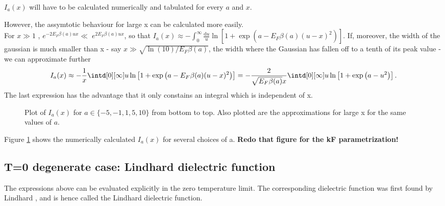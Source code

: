 \documentclass[physics,phd,nolot,nolof]{uccthesis}%
\newcommand{\alert}[1]{\textbf{\color{red}#1}}
\begin{document}
{$I_a(x)$ will have to be calculated numerically and tabulated for every $a$ and $x$. 

However, the assymtotic behaviour for large x can be calculated more easily.\\
For $x\gg1$ , $e^{-2E_F\beta(a)ux}\ll\;e^{2E_F\beta(a)ux}$, so that 
$I_a(x)\approx-\int_{0}^\infty\frac{\mathrm{d} u}{u}\ln\left[1+\exp\left(a-E_F\beta(a)(u-x)^2\right)\right]$.
If, moreover, the width of the gaussian is much smaller than x 
- say $x\gg\sqrt{\ln(10)/E_F\beta(a)}$, the width where the Gaussian has fallen off to a tenth of its peak value -
we can approximate further
\[
I_a(x)\approx-\frac{1}{x}\intd[0][\infty]u 
  \ln\left[ 1+\exp\left(a-E_F\beta(a)(u-x)^2 \right) \right]
  =-\frac{2}{\sqrt{E_F\beta(a)}x}\intd[0][\infty]u 
  \ln\left[ 1+\exp\left(a-u^2\right) \right]. 
\]
The last expression has the advantage that it only constains an integral which is independent of x.
\begin{figure}[ht]
  \begin{center}
    
  \end{center}
  \caption{Plot of $I_a(x)$ for $a \in \{-5,-1,1,5,10\}$ from bottom to top. Also plotted are the approximations for large x for the same values of $a$.}
  \label{fig:integral_a_x}
\end{figure}
Figure \ref{fig:integral_a_x} shows the numerically calculated $I_a(x)$ for several choices of a.
\alert{Redo that figure for the kF parametrization!}
\subsection{T=0 degenerate case: Lindhard dielectric function}
The expressions above can be evaluated explicitly in the zero temperature limit.
The corresponding dielectric function was first found by Lindhard \cite{Lindhard}, and is hence called the Lindhard dielectric function.

}
\end{document}
